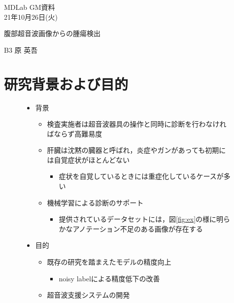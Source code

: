 \documentclass[a4j]{ujarticle}
\newcommand{\Fref}[1]{\mbox{図\ref{fig:#1}}}
\begin{document}
	\begin{flushright}
		MDLab GM資料\\
		21年10月26日(火)
	\end{flushright}

	\begin{center}
		{\Large	腹部超音波画像からの腫瘍検出}
	\end{center}

	\begin{flushright}
		{\large B3  原 英吾}\\
	\end{flushright}

	\section{研究背景および目的}
		\begin{figure}[h]
			\begin{minipage}{.59\textwidth}
				\begin{itemize}
					\item 背景
					\begin{itemize}
						\item 検査実施者は超音波器具の操作と同時に診断を行わなければならず高難易度
						\item 肝臓は沈黙の臓器と呼ばれ，炎症やガンがあっても初期には自覚症状がほとんどない
						\begin{itemize}
							\item 症状を自覚しているときには重症化しているケースが多い
						\end{itemize}
						\item 機械学習による診断のサポート
						\begin{itemize}
							\item 提供されているデータセットには，\Fref{ex}の様に明らかなアノテーション不足のある画像が存在する
						\end{itemize}
					\end{itemize}
					\item 目的
					\begin{itemize}
						\item 既存の研究を踏まえたモデルの精度向上
						\begin{itemize}
							\item noisy label\footnotemark[1]による精度低下の改善
						\end{itemize}
						\item 超音波支援システムの開発
						\begin{itemize}

\end{itemize}
\end{itemize}
\end{itemize}
\end{minipage}
\end{figure}
\end{document}
